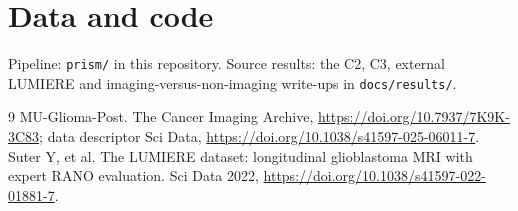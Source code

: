 \documentclass[11pt,a4paper]{article}
\begin{document}
\section*{Data and code}
Pipeline: \texttt{prism/} in this repository. Source results: the C2, C3, external LUMIERE and imaging-versus-non-imaging
write-ups in \texttt{docs/results/}.

\begin{thebibliography}{9}
 MU-Glioma-Post. The Cancer Imaging Archive, \url{https://doi.org/10.7937/7K9K-3C83}; data descriptor Sci Data,
\url{https://doi.org/10.1038/s41597-025-06011-7}.
 Suter Y, et al. The LUMIERE dataset: longitudinal glioblastoma MRI with expert RANO evaluation.
Sci Data 2022, \url{https://doi.org/10.1038/s41597-022-01881-7}.
\end{thebibliography}
\end{document}
